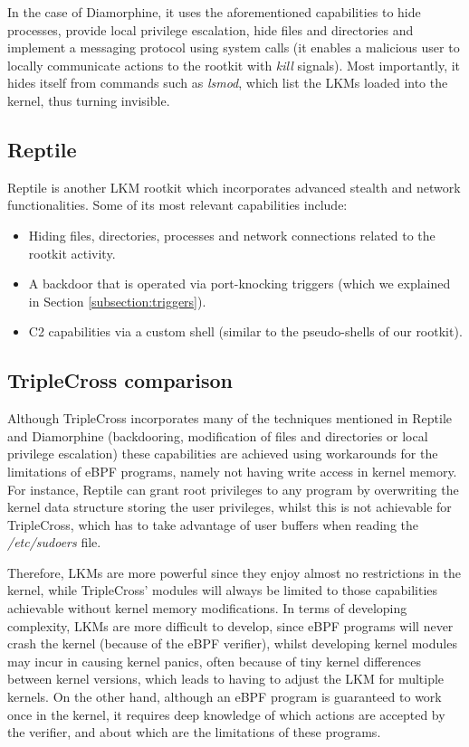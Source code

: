 In the case of Diamorphine, it uses the aforementioned capabilities to hide
processes, provide local privilege escalation, hide files and directories
and implement a messaging protocol using system calls (it enables a
malicious user to locally communicate actions to the rootkit with
\textit{kill} signals). Most importantly, it hides itself from commands
such as \textit{lsmod}, which list the LKMs loaded into the kernel, thus
turning invisible.

\subsection{Reptile}
Reptile \cite{reptile_github} is another LKM rootkit which incorporates
advanced stealth and network functionalities. Some of its most relevant
capabilities include:
\begin{itemize}
\item Hiding files, directories, processes and network connections related to the rootkit activity.
\item A backdoor that is operated via port-knocking triggers (which we explained in Section \ref{subsection:triggers}).
\item C2 capabilities via a custom shell (similar to the pseudo-shells of our rootkit).
\end{itemize}

\subsection{TripleCross comparison}
Although TripleCross incorporates many of the techniques mentioned in
Reptile and Diamorphine (backdooring, modification of files and directories
or local privilege escalation) these capabilities are achieved using
workarounds for the limitations of eBPF programs, namely not having write
access in kernel memory. For instance, Reptile can grant root privileges to
any program by overwriting the kernel data structure storing the user
privileges, whilst this is not achievable for TripleCross, which has to
take advantage of user buffers when reading the \textit{/etc/sudoers}
file.

Therefore, LKMs are more powerful since they enjoy almost no restrictions
in the kernel, while TripleCross' modules will always be limited to those
capabilities achievable without kernel memory modifications. In terms of
developing complexity, LKMs are more difficult to develop, since eBPF
programs will never crash the kernel (because of the eBPF verifier), whilst
developing kernel modules may incur in causing kernel panics, often because
of tiny kernel differences between kernel versions, which leads to having
to adjust the LKM for multiple kernels. On the other hand, although an eBPF
program is guaranteed to work once in the kernel, it requires deep
knowledge of which actions are accepted by the verifier, and about which
are the limitations of these programs.

